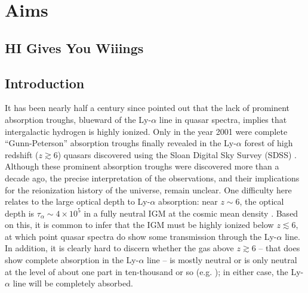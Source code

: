 \chapter{Aims}

\ifpdf
    \graphicspath{{neutral_islands/figures/PNG/}{example_chapter/figures/PDF/}{neutral_islands/figures/}}
\else
    \graphicspath{{neutral_islands/figures/EPS/}{neutral_islands/figures/}}
\fi



\section{HI Gives You Wiiings}

\section{Introduction} \label{sec:intro}


It has been nearly half a century since \citet{1965ApJ...142.1633G} pointed out that the lack of prominent
absorption troughs, blueward of the Ly-$\alpha$ line in quasar spectra, implies that intergalactic
hydrogen is highly ionized. 
Only in the year 2001 were 
complete ``Gunn-Peterson'' absorption troughs finally revealed in 
the Ly-$\alpha$ forest of high redshift ($z \gtrsim 6$) quasars discovered using the Sloan Digital Sky Survey (SDSS)
\citep{Fan:2001ff,Becker:2001ee,Djorgovski:2001ez}. 
Although these prominent absorption troughs were discovered more than a decade ago, the precise interpretation
of the observations, and their implications for the reionization history of the universe,
remain unclear. One difficulty here relates to the large optical depth to
Ly-$\alpha$ absorption: near $z \sim 6$, the optical depth 
is $\tau_\alpha \sim 4 \times 10^5$ in a fully neutral IGM at the cosmic mean density \citep{1965ApJ...142.1633G}. Based on this, it is common to infer 
that the IGM must be highly ionized below $z \lesssim 6$,
at which point quasar spectra do show some transmission through the Ly-$\alpha$ line. In addition, it is clearly hard
to discern whether the gas above $z \gtrsim 6$ -- that does show complete absorption in the Ly-$\alpha$ line --
is mostly neutral or is only neutral at the level of about one part in ten-thousand or so (e.g. \citealt{Fan:2005es}); in either case,
the Ly-$\alpha$ line will be completely absorbed.

